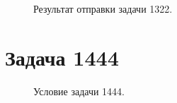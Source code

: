 \documentclass[a5paper, 10pt]{article}
\theoremstyle{definition}
\theoremstyle{plain}
\theoremstyle{remark}
\begin{document}
\begin{figure}[h]
\caption{Результат отправки задачи 1322.}
\end{figure}



\newpage
\section{Задача 1444}

\begin{figure}[h]
\caption{Условие задачи 1444.}
\end{figure}
\end{document}
